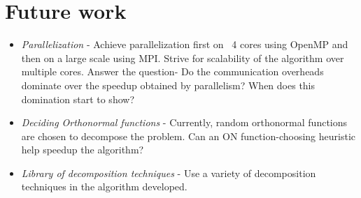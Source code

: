 \chapter{Future work}


\begin{itemize}
\item \textit{Parallelization} - Achieve parallelization first on ~4 cores using OpenMP and then on a large scale using MPI. Strive for scalability of the algorithm over multiple cores. Answer the question- Do the communication overheads dominate over the speedup obtained by parallelism? When does this domination start to show?

\item \textit{Deciding Orthonormal functions} - Currently, random orthonormal functions are chosen to decompose the problem. Can an ON function-choosing heuristic help speedup the algorithm?

\item \textit{Library of decomposition techniques} - Use a variety of decomposition techniques in the algorithm developed.

\end{itemize}
